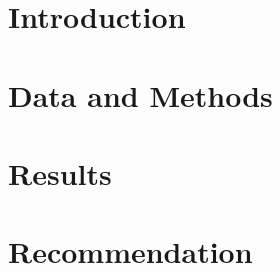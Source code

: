 \documentclass{article}
\begin{document}
\linespread{1.5}\selectfont

\section{Introduction}
\section{Data and Methods}
\section{Results}
\section{Recommendation}
\end{document}
